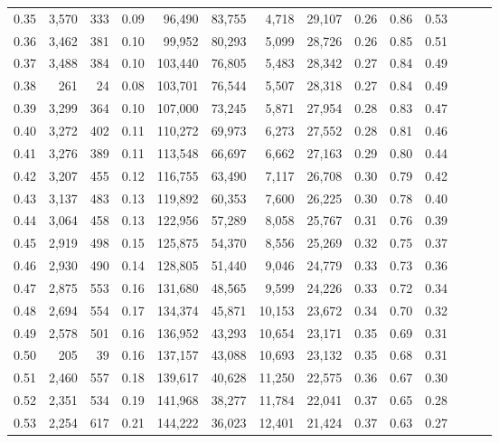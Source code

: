 \begin{tabular}{rrrrrrrrrrrrrr}
0.35 &  3,570 &  333 &  0.09 &   96,490 &   83,755 &   4,718 &  29,107 &  0.26 &  0.86 &      0.53 \\
0.36 &  3,462 &  381 &  0.10 &   99,952 &   80,293 &   5,099 &  28,726 &  0.26 &  0.85 &      0.51 \\
0.37 &  3,488 &  384 &  0.10 &  103,440 &   76,805 &   5,483 &  28,342 &  0.27 &  0.84 &      0.49 \\
0.38 &    261 &   24 &  0.08 &  103,701 &   76,544 &   5,507 &  28,318 &  0.27 &  0.84 &      0.49 \\
0.39 &  3,299 &  364 &  0.10 &  107,000 &   73,245 &   5,871 &  27,954 &  0.28 &  0.83 &      0.47 \\
0.40 &  3,272 &  402 &  0.11 &  110,272 &   69,973 &   6,273 &  27,552 &  0.28 &  0.81 &      0.46 \\
0.41 &  3,276 &  389 &  0.11 &  113,548 &   66,697 &   6,662 &  27,163 &  0.29 &  0.80 &      0.44 \\
0.42 &  3,207 &  455 &  0.12 &  116,755 &   63,490 &   7,117 &  26,708 &  0.30 &  0.79 &      0.42 \\
0.43 &  3,137 &  483 &  0.13 &  119,892 &   60,353 &   7,600 &  26,225 &  0.30 &  0.78 &      0.40 \\
0.44 &  3,064 &  458 &  0.13 &  122,956 &   57,289 &   8,058 &  25,767 &  0.31 &  0.76 &      0.39 \\
0.45 &  2,919 &  498 &  0.15 &  125,875 &   54,370 &   8,556 &  25,269 &  0.32 &  0.75 &      0.37 \\
0.46 &  2,930 &  490 &  0.14 &  128,805 &   51,440 &   9,046 &  24,779 &  0.33 &  0.73 &      0.36 \\
0.47 &  2,875 &  553 &  0.16 &  131,680 &   48,565 &   9,599 &  24,226 &  0.33 &  0.72 &      0.34 \\
0.48 &  2,694 &  554 &  0.17 &  134,374 &   45,871 &  10,153 &  23,672 &  0.34 &  0.70 &      0.32 \\
0.49 &  2,578 &  501 &  0.16 &  136,952 &   43,293 &  10,654 &  23,171 &  0.35 &  0.69 &      0.31 \\
0.50 &    205 &   39 &  0.16 &  137,157 &   43,088 &  10,693 &  23,132 &  0.35 &  0.68 &      0.31 \\
0.51 &  2,460 &  557 &  0.18 &  139,617 &   40,628 &  11,250 &  22,575 &  0.36 &  0.67 &      0.30 \\
0.52 &  2,351 &  534 &  0.19 &  141,968 &   38,277 &  11,784 &  22,041 &  0.37 &  0.65 &      0.28 \\
0.53 &  2,254 &  617 &  0.21 &  144,222 &   36,023 &  12,401 &  21,424 &  0.37 &  0.63 &      0.27 \\

\end{tabular}
